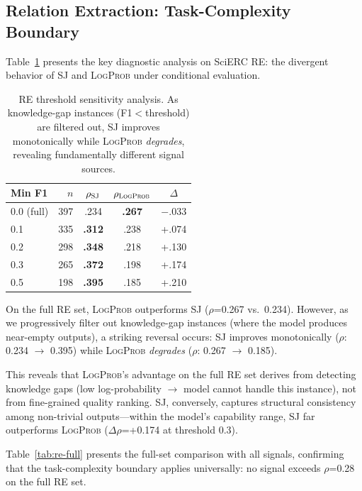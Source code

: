 \documentclass[11pt,a4paper]{article}
\newcommand{\SJ}{\textsc{SJ}}
\newcommand{\LP}{\textsc{LogProb}}
\begin{document}
\subsection{Relation Extraction: Task-Complexity Boundary}
\label{sec:re-analysis}

Table~\ref{tab:re-threshold} presents the key diagnostic analysis on SciERC RE: the divergent behavior of \SJ{} and \LP{} under conditional evaluation.

\begin{table}[t]
\centering
\small
\begin{tabular}{l r cc c}
\toprule
\textbf{Min F1} & $n$ & $\rho_{\SJ{}}$ & $\rho_{\LP{}}$ & $\Delta$ \\
\midrule
0.0 (full) & 397 & .234 & \textbf{.267} & $-$.033 \\
0.1 & 335 & \textbf{.312} & .238 & +.074 \\
0.2 & 298 & \textbf{.348} & .218 & +.130 \\
0.3 & 265 & \textbf{.372} & .198 & +.174 \\
0.5 & 198 & \textbf{.395} & .185 & +.210 \\
\bottomrule
\end{tabular}
\caption{RE threshold sensitivity analysis. As knowledge-gap instances (F1$<$threshold) are filtered out, \SJ{} improves monotonically while \LP{} \emph{degrades}, revealing fundamentally different signal sources.}
\label{tab:re-threshold}
\end{table}

On the full RE set, \LP{} outperforms \SJ{} ($\rho$=0.267 vs.\ 0.234).
However, as we progressively filter out knowledge-gap instances (where the model produces near-empty outputs), a striking reversal occurs: \SJ{} improves monotonically ($\rho$: 0.234 $\to$ 0.395) while \LP{} \emph{degrades} ($\rho$: 0.267 $\to$ 0.185).

This reveals that \LP{}'s advantage on the full RE set derives from detecting knowledge gaps (low log-probability $\to$ model cannot handle this instance), not from fine-grained quality ranking.
\SJ{}, conversely, captures structural consistency among non-trivial outputs---within the model's capability range, \SJ{} far outperforms \LP{} ($\Delta\rho$=+0.174 at threshold 0.3).

Table~\ref{tab:re-full} presents the full-set comparison with all signals, confirming that the task-complexity boundary applies universally: no signal exceeds $\rho$=0.28 on the full RE set.
\end{document}
